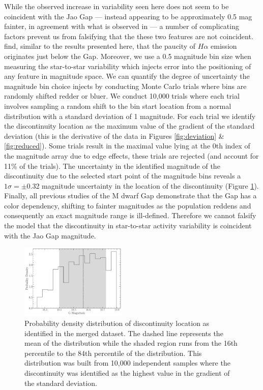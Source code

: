 While the observed increase in variability seen here does not seem to be
coincident with the Jao Gap --- instead appearing to be approximately 0.5 mag
fainter, in agreement with what is observed in \citet{Jao2023} --- a number of
complicating factors prevent us from falsifying that the these two features are
not coincident. \citeauthor{Jao2023} find, similar to the results presented
here, that the paucity of $H\alpha$ emission originates just below the Gap.
Moreover, we use a 0.5 magnitude bin size when measuring the star-to-star
variability which injects error into the positioning of any feature in
magnitude space. We can quantify the degree of uncertainty the magnitude bin
choice injects by conducting Monte Carlo trials where bins are randomly shifted
redder or bluer. We conduct 10,000 trials where each trial involves sampling a
random shift to the bin start location from a normal distribution with a
standard deviation of 1 magnitude. For each trial we identify the discontinuity
location as the maximum value of the gradient of the standard deviation (this
is the derivative of the data in Figures \ref{fig:deviation} \&
\ref{fig:reduced}). Some trials result in the maximal value lying at the 0th
index of the magnitude array due to edge effects, these trials are rejected
(and account for 11\% of the trials). The uncertainty in the identified
magnitude of the discontinuity due to the selected start point of the magnitude
bins reveals a $1\sigma = \pm$0.32 magnitude uncertainty in the location of the
discontinuity (Figure \ref{fig:GapLocationMC}). Finally, all previous studies
of the M dwarf Gap \citep{Jao2018, Jao2021, Mansfield2021, Boudreaux2022,
Jao2023} demonstrate that the Gap has a color dependency, shifting to fainter
magnitudes as the population reddens and consequently an exact magnitude range
is ill-defined. Therefore we cannot falsify the model that the discontinuity in
star-to-star activity variability is coincident with the Jao Gap magnitude.

\begin{figure}
  \centering
  \includegraphics[width=0.45\textwidth]{figures/GapLocationMC.pdf}
  \caption{Probability density distribution of discontinuity location as
  identified in the merged dataset. The dashed line represents the mean of the
  distribution while the shaded region runs from the 16th percentile to the
  84th percentile of the distribution. This distribution was built from 10,000
  independent samples where the discontinuity was identified as the highest
  value in the gradient of the standard deviation.}
  \label{fig:GapLocationMC}
\end{figure}

